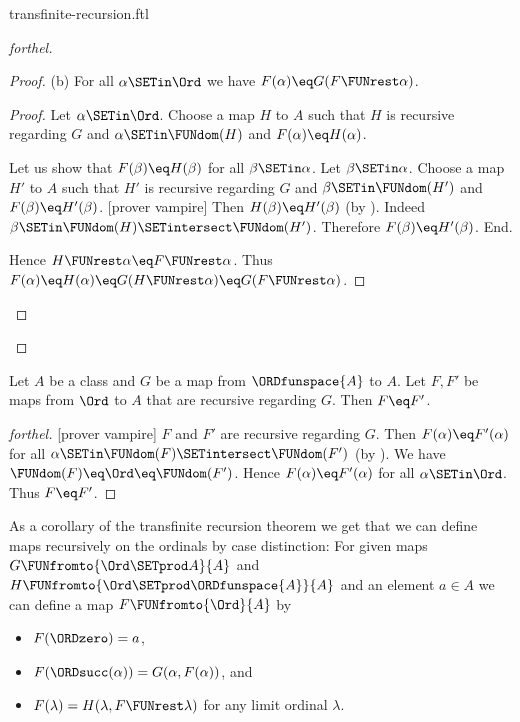 \documentclass{article}
\begin{document}
\begin{smodule}{transfinite-recursion.ftl}
\begin{proof}[forthel]
\begin{proof}
    (b) For all $\alpha \SETin \Ord$ we have $F(\alpha) \eq G(F \FUNrest \alpha)$.
    \begin{proof}
      Let $\alpha \SETin \Ord$.
      Choose a map $H$ to $A$ such that $H$ is recursive regarding $G$ and $\alpha \SETin \FUNdom(H)$ and $F(\alpha) \eq H(\alpha)$.

      Let us show that $F(\beta) \eq H(\beta)$ for all $\beta \SETin \alpha$.
        Let $\beta \SETin \alpha$.
        Choose a map $H'$ to $A$ such that $H'$ is recursive regarding $G$ and $\beta \SETin \FUNdom(H')$ and $F(\beta) \eq H'(\beta)$.
        [prover vampire]
        Then $H(\beta) \eq H'(\beta)$ (by ).
        Indeed $\beta \SETin \FUNdom(H) \SETintersect \FUNdom(H')$.
        Therefore $F(\beta) \eq H'(\beta)$.
      End.

      Hence $H \FUNrest \alpha \eq F \FUNrest \alpha$.
      Thus $F(\alpha)
        \eq H(\alpha)
        \eq G(H \FUNrest \alpha)
        \eq G(F \FUNrest \alpha)$.
    \end{proof}
  \end{proof}
\end{proof}

\begin{theorem}[forthel,title=Transfinite Recursion Theorem: Uniqueness,id=transfinite_recursion_uniqueness]
  Let $A$ be a class and $G$ be a map from $\ORDfunspace{A}$ to $A$.
  Let $F, F'$ be maps from $\Ord$ to $A$ that are recursive regarding $G$.
  Then $F \eq F'$.
\end{theorem}
\begin{proof}[forthel]
  [prover vampire]
  $F$ and $F'$ are recursive regarding $G$.
  Then $F(\alpha) \eq F'(\alpha)$ for all $\alpha \SETin \FUNdom(F) \SETintersect \FUNdom(F')$ (by ).
  We have $\FUNdom(F) \eq \Ord \eq \FUNdom(F')$.
  Hence $F(\alpha) \eq F'(\alpha)$ for all $\alpha \SETin \Ord$.
  Thus $F \eq F'$.
\end{proof}

As a corollary of the transfinite recursion theorem we get that we can
define maps recursively on the ordinals by case distinction:
For given maps $G \FUNfromto{\Ord \SETprod A}{A}$ and
$H \FUNfromto{\Ord \SETprod \ORDfunspace{A}}{A}$ and an element $a \in A$ we
can define a map $F \FUNfromto{\Ord}{A}$ by
\begin{itemize}
  \item $F(\ORDzero) = a$,
  \item $F(\ORDsucc(\alpha)) = G(\alpha, F(\alpha))$, and
  \item $F(\lambda) = H(\lambda, F \FUNrest \lambda)$
    for any limit ordinal $\lambda$.
\end{itemize}


\end{smodule}
\end{document}
